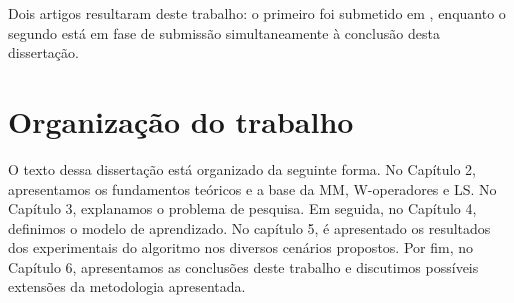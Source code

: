 Dois artigos resultaram deste trabalho: o primeiro foi submetido em \cite{DIEGO:USDMM}, enquanto o segundo está em fase de submissão simultaneamente à conclusão desta dissertação.

\section{Organização do trabalho}

O texto dessa dissertação está organizado da seguinte forma. No Capítulo 2, apresentamos os fundamentos teóricos e a base da MM, W-operadores e LS. No Capítulo 3, explanamos o problema de pesquisa. Em seguida, no Capítulo 4, definimos o modelo de aprendizado. No capítulo 5, é apresentado os resultados dos experimentais do algoritmo nos diversos cenários propostos. Por fim, no Capítulo 6, apresentamos as conclusões deste trabalho e discutimos possíveis extensões da metodologia apresentada.